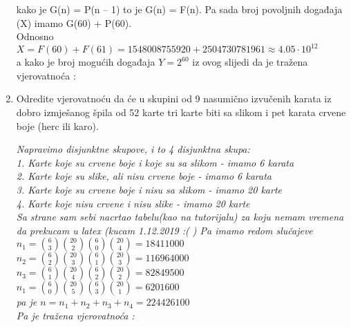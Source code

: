 \documentclass[12pt]{article}
\begin{document}
\begin{enumerate}
\begin{center}
{kako je G(n) = P(n – 1) to je G(n) = F(n). Pa sada broj povoljnih
događaja (X) imamo G(60) + P(60). \\ \vspace{0.25cm}
Odnosno $X = F(60) + F(61) = 1548008755920 + 2504730781961 \approx 4.05 \cdot 10^{12}$ \\ 
a kako je broj mogućih događaja $Y = 2^{60}$ iz ovog slijedi da je tražena vjerovatnoća : 
\\ \vspace{0.25cm}
		}
	    \end{center}
		\item Odredite vjerovatnoću da će u skupini od 9 nasumično izvučenih karata iz dobro izmješanog špila od 52 karte tri karte biti sa slikom i pet karata crvene boje (herc ili karo).
		\begin{center}
		\textit{
		Napravimo disjunktne skupove, i to 4 disjunktna skupa: \\
1. Karte koje su crvene boje i koje su  sa slikom - imamo 6 karata \\
2. Karte koje su slike, ali nisu crvene boje - imamo 6 karata \\
3. Karte koje su crvene boje i nisu sa slikom - imamo 20 karte \\
4. Karte koje nisu crvene i nisu slike - imamo 20 karte \\
\vspace{0.25cm}
Sa strane sam sebi nacrtao tabelu(kao na tutorijalu) za koju nemam vremena da prekucam u latex (kucam 1.12.2019 :( )
\vspace{0.25cm}
Pa imamo redom slučajeve \\ \vspace{0.15cm}
$n_1 = {6\choose3}{20\choose2}{6\choose0}{20\choose4} = 18411000$ \\ \vspace{0.15cm}
$n_2 = {6\choose2}{20\choose3}{6\choose1}{20\choose3} = 116964000$ \\ \vspace{0.15cm}
$n_3 = {6\choose1}{20\choose4}{6\choose2}{20\choose2} = 82849500$ \\ \vspace{0.15cm}
$n_1 = {6\choose0}{20\choose5}{6\choose3}{20\choose1} = 6201600$ \\ \vspace{0.15cm}
pa je $n = n_1+n_2+n_3+n_4 = 224426100$ \\ \vspace{0.25cm}
Pa je tražena vjerovatnoća : 
}
	    \end{center}
	     

\end{enumerate}
\end{document}
